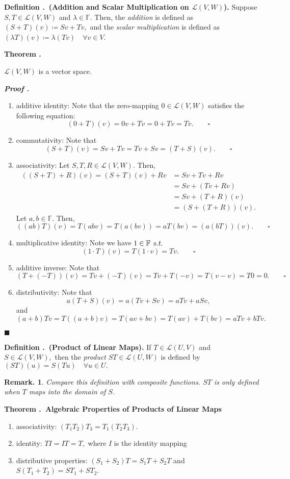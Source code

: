 \documentclass[11pt, letterpaper]{article}
\newcounter{index}[subsection]
\newenvironment*{df}[1]{\par\noindent\textbf{Definition \thesubsection.\stepcounter{index}\theindex\ (#1).}}{\par}
\newenvironment*{thm}[1]{\begin{tcolorbox}\par\noindent\textbf{Theorem \thesubsection.\stepcounter{index}\theindex\ #1} \par}{\par\end{tcolorbox}}
\newcounter{nprf}[subsection]
\newenvironment*{prf}{\par\indent\textbf{\textit{Proof \stepcounter{nprf}\thenprf.}}}{\hfill$\blacksquare$\par}
\newtheorem*{rmk}{Remark.}
\def\F{\mathbb{F}}
\def\L{\mathcal{L}}
\def\st{\emph{ s.t. }}
\def\pqde{\qquad\square}
\begin{document}
\begin{df}{Addition and Scalar Multiplication on $\L(V,W)$}
	Suppose $S,T\in\L(V,W)$ and $\lambda\in\F.$ Then, the \textit{addition} is defined as $(S+T)(v)\coloneqq Sv+Tv,$ and the \textit{scalar multiplication} is defined as $(\lambda T)(v)\coloneqq\lambda(Tv)\quad\forall v\in V$.	
\end{df}
\begin{thm}{}
	$\L(V,W)$ is a vector space.
\end{thm}
\begin{prf}
	\begin{enumerate}
		\item additive identity: Note that the zero-mapping $0\in\L(V,W)$ satisfies the following equation: \[(0+T)(v)=0v+Tv=0+Tv=Tv.\qquad\square\]
		\item commutativity: Note that \[(S+T)(v)=Sv+Tv=Tv+Sv=(T+S)(v).\qquad\square\]
		\item associativity: Let $S,T,R\in\L(V,W).$ Then, \[\begin{aligned}((S+T)+R)(v)=(S+T)(v)+Rv&=Sv+Tv+Rv\\&=Sv+(Tv+Rv)\\&=Sv+(T+R)(v)\\&=(S+(T+R))(v).\end{aligned}\] Let $a,b\in\F.$ Then, \[((ab)T)(v)=T(abv)=T(a(bv))=aT(bv)=(a(bT))(v).\pqde\]
		\item multiplicative identity: Note we have $1\in\F\st$\[(1\cdot T)(v)=T(1\cdot v)=Tv.\pqde\]
		\item additive inverse: Note that \[(T+(-T))(v)=Tv+(-T)(v)=Tv+T(-v)=T(v-v)=T0=0.\pqde\]
		\item distributivity: Note that \[a(T+S)(v)=a(Tv+Sv)=aTv+aSv,\] and \[(a+b)Tv=T((a+b)v)=T(av+bv)=T(av)+T(bv)=aTv+bTv.\]
	\end{enumerate}
\end{prf}
\begin{df}{Product of Linear Maps}
	If $T\in\L(U,V)$ and $S\in\L(V,W),$ then the \textit{product} $ST\in\L(U,W)$ is defined by $(ST)(u)=S(Tu)\quad\forall u\in U.$	
\end{df}
\begin{rmk}
	Compare this definition with composite functions. $ST$ is only defined when $T$ maps into the domain of $S$.	
\end{rmk}
\begin{thm}{Algebraic Properties of Products of Linear Maps}
	\begin{enumerate}
		\item associativity: $(T_1T_2)T_3=T_1(T_2T_3)$.
		\item identity: $TI=IT=T,$ where $I$ is the identity mapping
		\item distributive properties: $(S_1+S_2)T=S_1T+S_2T$ and $S(T_1+T_2)=ST_1+ST_2$.
	\end{enumerate}
\end{thm}
\end{document}
